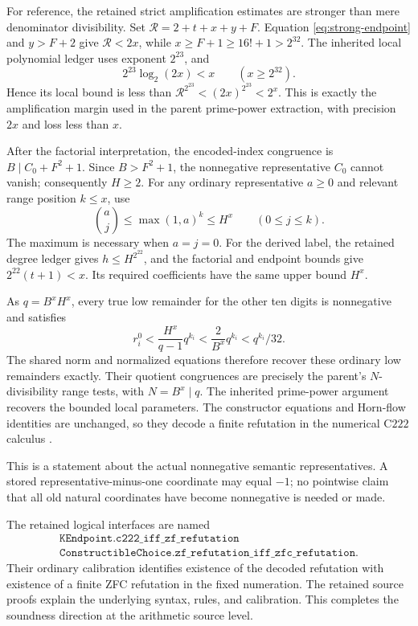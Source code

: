 \documentclass[11pt]{article}
\theoremstyle{definition}\newtheorem{definition}[theorem]{Definition}
\begin{document}
For reference, the retained strict amplification estimates are stronger
than mere denominator divisibility. Set
\(\mathcal R=2+t+x+y+F\). Equation \eqref{eq:strong-endpoint}
and \(y>F+2\) give \(\mathcal R<2x\), while
\(x\ge F+1\ge16!+1>2^{32}\). The inherited local polynomial
ledger uses exponent \(2^{23}\), and
\[
 2^{23}\log_2(2x)<x\qquad(x\ge2^{32}).
\]
Hence its local bound is less than
\(\mathcal R^{2^{23}}<(2x)^{2^{23}}<2^x\).
This is exactly the amplification margin used in the parent
prime-power extraction, with precision \(2x\) and loss less than \(x\).

After the factorial interpretation, the encoded-index congruence is
\(B\mid C_0+F^2+1\). Since \(B>F^2+1\), the nonnegative
representative \(C_0\) cannot vanish; consequently \(H\ge2\).
For any ordinary representative \(a\ge0\) and relevant range position
\(k\le x\), use
\[
 \binom aj\le\max(1,a)^k\le H^x\qquad(0\le j\le k).
\]
The maximum is necessary when \(a=j=0\).
For the derived label, the retained degree ledger gives
\(h\le H^{2^{22}}\), and the factorial and endpoint bounds give
\(2^{22}(t+1)<x\). Its required coefficients have the same
upper bound \(H^x\).

As \(q=B^xH^x\), every true low remainder for the other ten digits
is nonnegative and satisfies
\[
 r_i^0<\frac{H^x}{q-1}q^{k_i}
       <\frac{2}{B^x}q^{k_i}<q^{k_i}/32.
\]
The shared norm and normalized equations therefore recover these
ordinary low remainders exactly. Their quotient congruences are precisely
the parent's \(N\)-divisibility range tests, with \(N=B^x\mid q\).
The inherited prime-power argument recovers the bounded local
parameters. The constructor equations and Horn-flow identities are
unchanged, so they decode a finite refutation in the numerical
\(\mathrm{C222}\) calculus \cite{common,repo}.

This is a statement about the actual nonnegative semantic
representatives. A stored representative-minus-one coordinate may
equal \(-1\); no pointwise claim that all old natural coordinates have
become nonnegative is needed or made.

The retained logical interfaces are named
\[
 \begin{gathered}
 \texttt{KEndpoint.c222\_iff\_zf\_refutation}
 \\
 \texttt{ConstructibleChoice.zf\_refutation\_iff\_zfc\_refutation}.
 \end{gathered}
\]
Their ordinary calibration identifies existence of the decoded
refutation with existence of a finite ZFC refutation in the fixed
numeration. The retained source proofs explain the underlying syntax,
rules, and calibration. This completes the soundness direction at the
arithmetic source level.
\end{document}
